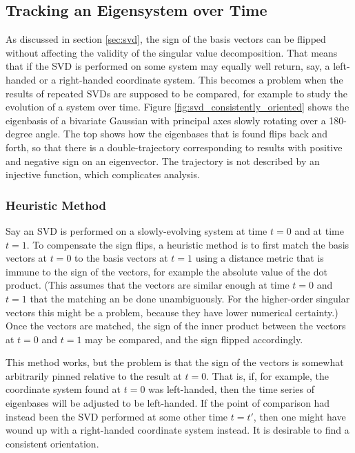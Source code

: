 \subsection{Tracking an Eigensystem over Time}
\label{sec:svd_tracking}
	
As discussed in section \ref{sec:svd}, the sign of the basis vectors can be flipped without affecting the validity of the singular value decomposition. That means that if the SVD is performed on some system may equally well return, say, a left-handed or a right-handed coordinate system. This becomes a problem when the results of repeated SVDs are supposed to be compared, for example to study the evolution of a system over time. Figure \ref{fig:svd_consistently_oriented} shows the eigenbasis of a bivariate Gaussian with principal axes slowly rotating over a 180-degree angle. The top shows how the eigenbases that is found flips back and forth, so that there is a double-trajectory corresponding to results with positive and negative sign on an eigenvector. The trajectory is not described by an injective function, which complicates analysis. 


\subsubsection{Heuristic Method}
Say an SVD is performed on a slowly-evolving system at time $t=0$ and at time $t=1$. To compensate the sign flips, a heuristic method is to first match the basis vectors at $t=0$ to the basis vectors at $t=1$ using a distance metric that is immune to the sign of the vectors, for example the absolute value of the dot product. (This assumes that the vectors are similar enough at time $t=0$ and $t=1$ that the matching an be done unambiguously. For the higher-order singular vectors this might be a problem, because they have lower numerical certainty.) Once the vectors are matched, the sign of the inner product between the vectors at $t=0$ and $t=1$ may be compared, and the sign flipped accordingly. 

This method works, but the problem is that the sign of the vectors is somewhat arbitrarily pinned relative to the result at $t=0$. That is, if, for example, the coordinate system found at $t=0$ was left-handed, then the time series of eigenbases will be adjusted to be left-handed. If the point of comparison had instead been the SVD performed at some other time $t=t'$, then one might have wound up with a right-handed coordinate system instead. It is desirable to find a consistent orientation.   


